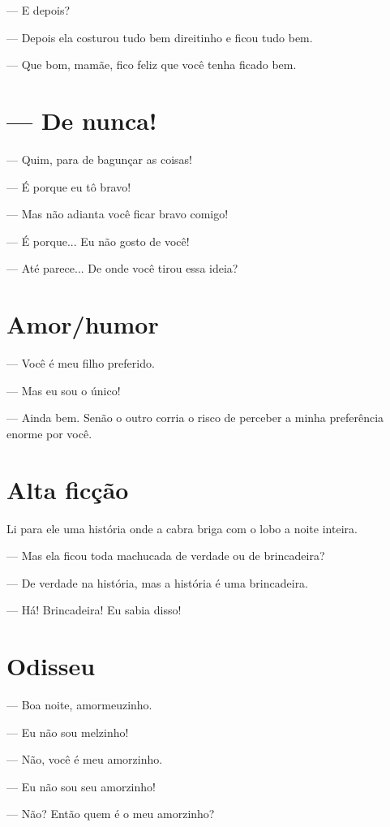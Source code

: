 {--- E depois?

--- Depois ela costurou tudo bem direitinho e ficou tudo bem.

--- Que bom, mamãe, fico feliz que você tenha ficado bem.

\chapter{--- De nunca!}\label{de-nunca}

--- Quim, para de bagunçar as coisas!

--- É porque eu tô bravo!

--- Mas não adianta você ficar bravo comigo!

--- É porque... Eu não gosto de você!

--- Até parece... De onde você tirou essa ideia?

\chapter{Amor/humor}\label{amorhumor}

--- Você é meu filho preferido.

--- Mas eu sou o único!

--- Ainda bem. Senão o outro corria o risco de perceber a minha
preferência enorme por você.

\chapter{Alta ficção}\label{alta-ficuxe7uxe3o}

Li para ele uma história onde a cabra briga com o lobo a noite inteira.

--- Mas ela ficou toda machucada de verdade ou de brincadeira?

--- De verdade na história, mas a história é uma brincadeira.

--- Há! Brincadeira! Eu sabia disso!

\chapter{Odisseu}\label{odisseu}

--- Boa noite, amormeuzinho.

--- Eu não sou melzinho!

--- Não, você é meu amorzinho.

--- Eu não sou seu amorzinho!

--- Não? Então quem é o meu amorzinho?

}
